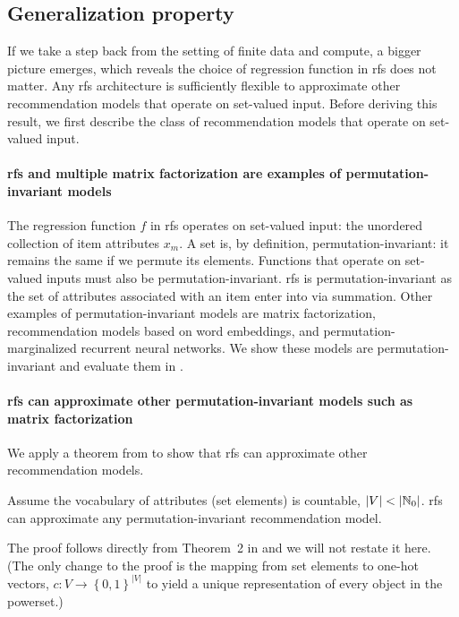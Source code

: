 \subsection{Generalization property}
\label{subsec:method:generalization}
If we take a step back from the setting of finite data and compute, a bigger
picture emerges, which reveals the choice of regression function in \gls{rfs}
does not matter. Any \gls{rfs} architecture is sufficiently flexible to
approximate other recommendation models that operate on set-valued input. Before
deriving this result, we first describe the class of recommendation models that
operate on set-valued input.

\paragraph{\gls{rfs} and multiple matrix factorization are examples of
  permutation-invariant models} The regression function $f$ in \gls{rfs}
operates on set-valued input: the unordered collection of item attributes $x_m$.
A set is, by definition, permutation-invariant: it remains the same if we
permute its elements. Functions that operate on set-valued inputs must also be
permutation-invariant. \gls{rfs} is permutation-invariant as the set of
attributes associated with an item enter into
 via summation. Other
examples of permutation-invariant models are matrix factorization,
recommendation models based on word embeddings, and permutation-marginalized
recurrent neural networks. We show these models are permutation-invariant and
evaluate them in .

\paragraph{\gls{rfs} can approximate other permutation-invariant
  models such as matrix factorization} We apply a theorem from
\citet{zaheer2017deep} to show that \gls{rfs} can approximate
other recommendation models.

\begin{proposition}
  Assume the vocabulary of attributes (set elements) is countable,
  $\lvert V \rvert < \lvert \mathbb{N}_0 \rvert$. \acrshort{rfs} can approximate any
  permutation-invariant recommendation model.
  \label{prop:universal-approximation}
\end{proposition}
The proof follows directly from Theorem~2 in \citet{zaheer2017deep} and we will
not restate it here. (The only change to the proof is the mapping from set
elements to one-hot vectors,
$c \colon V \to \left\{0, 1\right\}^{\lvert V \rvert}$ to yield a unique
representation of every object in the powerset.)


